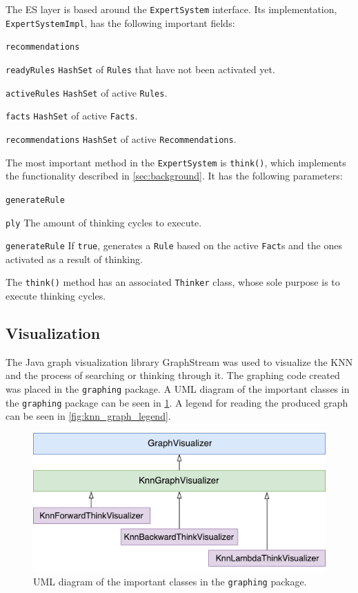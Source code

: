 \documentclass[titlepage,11pt]{article}
\newcommand{\code}[1]{\texttt{#1}}
\begin{document}
The ES layer is based around the \code{ExpertSystem} interface. Its implementation, \code{ExpertSystemImpl}, has the following important fields:

\begin{labeling}{\code{recommendations}}
	\item[\code{readyRules}] \code{HashSet} of \code{Rules} that have not been activated yet.
	\item[\code{activeRules}] \code{HashSet} of active \code{Rules}.
	\item[\code{facts}] \code{HashSet} of active \code{Facts}.
	\item[\code{recommendations}] \code{HashSet} of active \code{Recommendations}.
\end{labeling}

The most important method in the \code{ExpertSystem} is \code{think()}, which implements the functionality described in \cref{sec:background}. It has the following parameters:

\begin{labeling}{\code{generateRule}}
	\item[\code{ply}] The amount of thinking cycles to execute.
	\item[\code{generateRule}] If \code{true}, generates a \code{Rule} based on the active \code{Fact}s and the ones activated as a result of thinking.
\end{labeling}

The \code{think()} method has an associated \code{Thinker} class, whose sole purpose is to execute thinking cycles.

\subsection{Visualization}
The Java graph visualization library GraphStream was used to visualize the KNN and the process of searching or thinking through it. The graphing code created was placed in the \code{graphing} package. A UML diagram of the important classes in the \code{graphing} package can be seen in \cref{fig:uml_graphing}. A legend for reading the produced graph can be seen in \cref{fig:knn_graph_legend}.

\begin{figure}[!htb]
	\includegraphics[width=\columnwidth]{figures/uml_graphing.pdf}
	{UML diagram of the important classes in the \code{graphing} package.}
	\label{fig:uml_graphing}
\end{figure}
\end{document}

